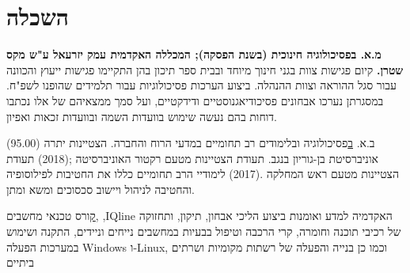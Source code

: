 %

\section{השכלה}

{\textbf{מ.א. בפסיכולוגיה חינוכית (בשנת הפסקה); המכללה האקדמית עמק יזרעאל ע"ש מקס שטרן.}}
{קיום פגישות צוות בגני חינוך מיוחד ובבית ספר תיכון בהן התקיימו פגישות ייעוץ והכוונה עבור סגל ההוראה וצוות ההנהלה. 
ביצוע הערכות פסיכולוגיות עבור תלמידים שהופנו לשפ"ח. במסגרתן נערכו אבחונים פסיכודיאגנוסטיים ודידקטיים, ועל סמך ממצאיהם של אלו נכתבו דוחות בהם נעשה שימוש בוועדות השמה ובוועדות זכאות ואפיון.}
{}

{
ב.א.
\href{https://loona-il.000webhostapp.com/resume-references/BA-and-honorary.pdf}
בפסיכולוגיה ובלימודים רב תחומיים במדעי הרוח והחברה.
הצטיינות יתרה (95.00) אוניברסיטת בן-גוריון בנגב.}
{תעודת הצטיינות מטעם רקטור האוניברסיטה ;(2018) תעודת הצטיינות מטעם ראש המחלקה .(2017)
לימודיי הרב תחומיים כללו את החטיבות לפילוסופיה והחטיבה לניהול ויישוב סכסוכים ומשא ומתן.}
{}

\par{\par}

{\href{https://loona-il.000webhostapp.com/resume-references/computer-technitian-certificate.jpg}
קורס טכנאי מחשבים,
,IQline
האקדמיה למדע ואומנות}
{ביצוע הליכי אבחון, תיקון, ותחזוקה של רכיבי תוכנה וחומרה, קרי הרכבה וטיפול בבעיות במחשבים נייחים וניידים, התקנה ושימוש במערכות הפעלה Windows ו-Linux, וכמו כן בנייה והפעלה של רשתות מקומיות ושרתים ביתיים}
{}
{}

